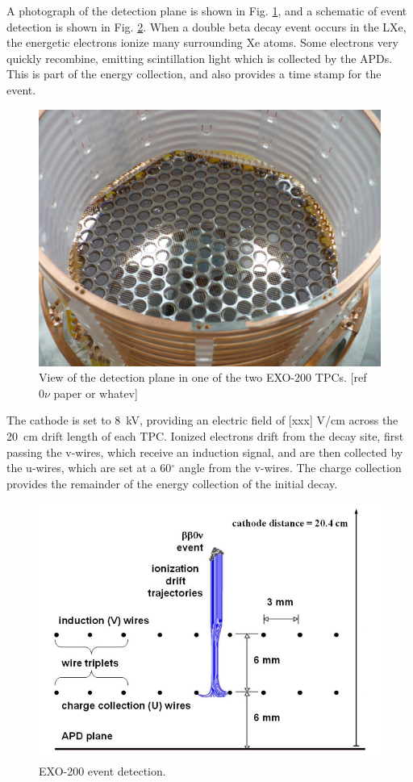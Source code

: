 A photograph of the detection plane is shown in Fig. \ref{fig:tpcphoto}, and a schematic of event detection is shown in Fig. \ref{fig:detectionplane}.  When a double beta decay event occurs in the LXe, the energetic electrons ionize many surrounding Xe atoms.  Some electrons very quickly recombine, emitting scintillation light which is collected by the APDs.  This is part of the energy collection, and also provides a time stamp for the event.  

\begin{figure}[H]
	\centering
	\includegraphics[width=.7\textwidth]{figures/TPCphoto.jpeg}
	\caption{View of the detection plane in one of the two EXO-200 TPCs.  [ref $0\nu$ paper or whatev] }
\label{fig:tpcphoto}
\end{figure}

The cathode is set to 8~kV, providing an electric field of [xxx] V/cm across the 20~cm drift length of each TPC.  Ionized electrons drift from the decay site, first passing the v-wires, which receive an induction signal, and are then collected by the u-wires, which are set at a  {\color{red}60$^\circ$} angle from the v-wires.  The charge collection provides the remainder of the energy collection of the initial decay.

\begin{figure}[H]
	\centering
	\includegraphics[width=.7\textwidth]{figures/anodecathodedriftcharges.png}
	\caption{EXO-200 event detection.  }
\label{fig:detectionplane}
\end{figure}


